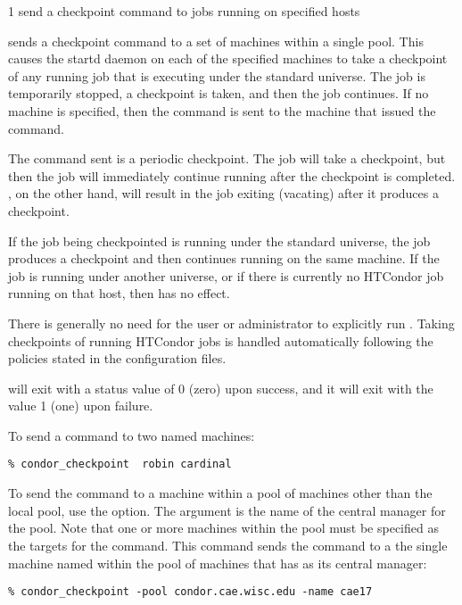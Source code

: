 \begin{ManPage}{\label{man-condor-checkpoint}}{1}
{send a checkpoint command to jobs running on specified hosts}
\Synopsis {}
\ToolArgsBase

\ToolDebugOption
\ToolWhere


\Description
{} sends a checkpoint command to a set
of machines within a single pool.
This causes the startd daemon on each of the specified machines
to take a checkpoint of any running job that is executing under
the standard universe.
The job is temporarily stopped, a checkpoint is taken,
and then the job continues.
If no machine is specified, then the command
is sent to the machine that issued the
 command.

The command sent is a periodic checkpoint.
The job will take a checkpoint, but then the job will immediately
continue running after the checkpoint is completed.
, on the other hand, will result in the job exiting
(vacating) after it produces a checkpoint. 

If the job being checkpointed is running under the standard universe,
the job produces a checkpoint and then continues running
on the same machine.
If the job is running under another universe,
or if there is currently no HTCondor job
running on that host, then  has no effect. 

There is generally no need for the user or administrator to explicitly
run .
Taking checkpoints of running HTCondor jobs is
handled automatically following the policies
stated in the configuration files. 

\begin{Options}
	\ToolArgsBaseDesc
	\ToolDebugDesc
	\ToolArgsLocateDesc
\end{Options}

\ExitStatus

 will exit with a status value of 0 (zero) upon success,
and it will exit with the value 1 (one) upon failure.

\Examples
To send a  command to two named machines:
\begin{verbatim}
% condor_checkpoint  robin cardinal
\end{verbatim}

To send the  command to a machine
within a pool of machines other than the local pool,
use the  option.
The argument is the name of the central manager for the pool.
Note that one or more machines within the pool must be
specified as the targets for the command.
This command sends the command to
a the single machine named  within the
pool of machines that has  as
its central manager:
\begin{verbatim}
% condor_checkpoint -pool condor.cae.wisc.edu -name cae17
\end{verbatim}

\end{ManPage}
